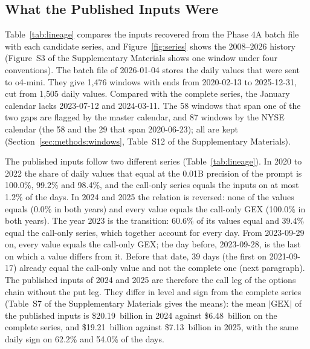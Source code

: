 \subsection{What the Published Inputs Were}
\label{sec:results:inputs}

Table~\ref{tab:lineage} compares the inputs recovered from the Phase 4A batch file with each candidate series, and Figure~\ref{fig:series} shows the 2008--2026 history (Figure~S3 of the Supplementary Materials shows one window under four conventions).
The batch file of 2026-01-04 stores the daily values that were sent to o4-mini. They give 1{,}476 windows with ends from 2020-02-13 to 2025-12-31, cut from 1{,}505 daily values. Compared with the complete series, the January calendar lacks 2023-07-12 and 2024-03-11. The 58 windows that span one of the two gaps are flagged by the master calendar, and 87 windows by the NYSE calendar (the 58 and the 29 that span 2020-06-23); all are kept (Section~\ref{sec:methods:windows}, Table~S12 of the Supplementary Materials).

The published inputs follow two different series (Table~\ref{tab:lineage}). In 2020 to 2022 the share of daily values that equal  at the 0.01B precision of the prompt is 100.0\%, 99.2\% and 98.4\%, and the call-only series equals the inputs on at most 1.2\% of the days. In 2024 and 2025 the relation is reversed: none of the values equals  (0.0\% in both years) and every value equals the call-only GEX (100.0\% in both years). The year 2023 is the transition: 60.6\% of its values equal  and 39.4\% equal the call-only series, which together account for every day. From 2023-09-29 on, every value equals the call-only GEX; the day before, 2023-09-28, is the last on which a value differs from it. Before that date, 39 days (the first on 2021-09-17) already equal the call-only value and not the complete one (next paragraph). The published inputs of 2024 and 2025 are therefore the call leg of the options chain without the put leg. They differ in level and sign from the complete series (Table~S7 of the Supplementary Materials gives the means): the mean $|\mathrm{GEX}|$ of the published inputs is \$20.19~billion in 2024 against \$6.48~billion on the complete series, and \$19.21~billion against \$7.13~billion in 2025, with the same daily sign on 62.2\% and 54.0\% of the days.

